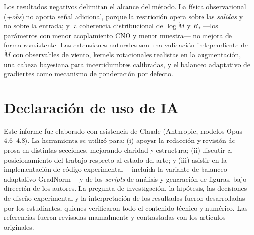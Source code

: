 \documentclass[sigconf,ACM]{acmart}
\begin{document}
Los resultados negativos delimitan el alcance del método. La física observacional
(\emph{+obs}) no aporta señal adicional, porque la restricción opera sobre las
\emph{salidas} y no sobre la entrada; y la coherencia distribucional de
$\log\dot{M}$ y $R_*$ ---los parámetros con menor acoplamiento CNO y menor muestra---
no mejora de forma consistente. Las extensiones naturales son una validación
independiente de $\dot{M}$ con observables de viento, kernels rotacionales realistas
en la augmentación, una cabeza bayesiana para incertidumbres calibradas, y el
balanceo adaptativo de gradientes como mecanismo de ponderación por defecto.

\section{Declaración de uso de IA}
Este informe fue elaborado con asistencia de Claude (Anthropic, modelos Opus 4.6--4.8). La herramienta se utilizó para: (i) apoyar la redacción y revisión de prosa en distintas secciones, mejorando claridad y estructura; (ii) discutir el posicionamiento del trabajo respecto al estado del arte; y (iii) asistir en la implementación de código experimental ---incluida la variante de balanceo adaptativo GradNorm--- y de los \emph{scripts} de análisis y generación de figuras, bajo dirección de los autores. La pregunta de investigación, la hipótesis, las decisiones de diseño experimental y la interpretación de los resultados fueron desarrolladas por los estudiantes, quienes verificaron todo el contenido técnico y numérico. Las referencias fueron revisadas manualmente y contrastadas con los artículos originales.



\end{document}
